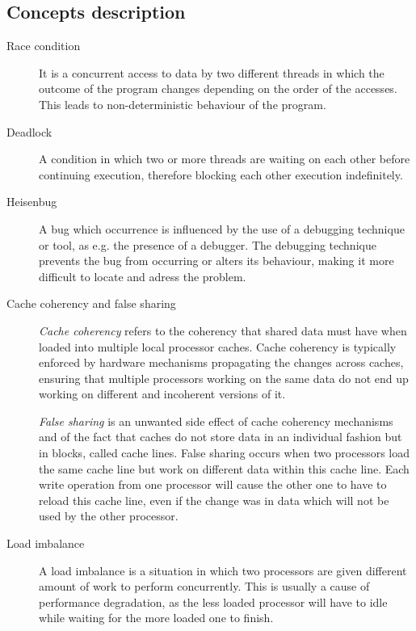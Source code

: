 \documentclass{article}
\begin{document}
\subsection{Concepts description}
\begin{description}
	\item[Race condition]

	It is a concurrent access to data by two different threads in which the outcome of the program changes depending on the order of the accesses. This leads to non-deterministic behaviour of the program.

	\item[Deadlock]

	A condition in which two or more threads are waiting on each other before continuing execution, therefore blocking each other execution indefinitely.
	
	\item[Heisenbug] 

	A bug which occurrence is influenced by the use of a debugging technique or tool, as e.g. the presence of a debugger. The debugging technique prevents the bug from occurring or alters its behaviour, making it more difficult to locate and adress the problem.
	
	\item[Cache coherency and false sharing] 

	\emph{Cache coherency} refers to the coherency that shared data must have when loaded into multiple local processor caches. Cache coherency is typically enforced by hardware mechanisms propagating the changes across caches, ensuring that multiple processors working on the same data do not end up working on different and incoherent versions of it.

	\emph{False sharing} is an unwanted side effect of cache coherency mechanisms and of the fact that caches do not store data in an individual fashion but in blocks, called cache lines. False sharing occurs when two processors load the same cache line but work on different data within this cache line. Each write operation from one processor will cause the other one to have to reload this cache line, even if the change was in data which will not be used by the other processor.
	
	\item[Load imbalance] 

	A load imbalance is a situation in which two processors are given different amount of work to perform concurrently. This is usually a cause of performance degradation, as the less loaded processor will have to idle while waiting for the more loaded one to finish.
	

\end{description}
\end{document}
